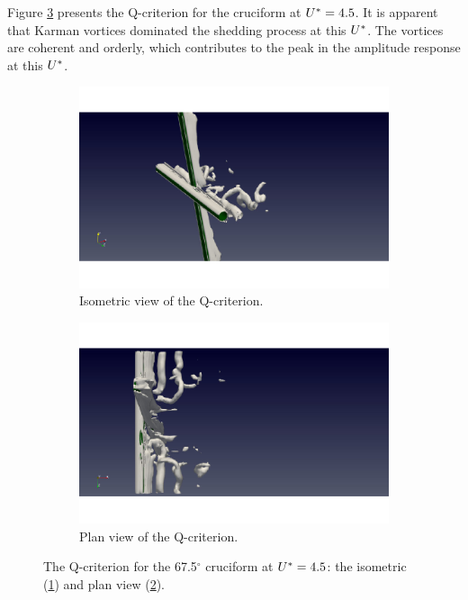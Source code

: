\documentclass[oneside]{utmthesis}
\begin{document}
Figure \ref{fig:qCrit675U02} presents the Q-criterion for the \angfo{} cruciform at $U^{*}=4.5$. It is apparent that Karman vortices dominated the shedding process at this $U^{*}$. The vortices are coherent and orderly, which contributes to the peak in the amplitude response at this $U^{*}$.

\begin{figure}[H]
  \centering
  \begin{subfigure}[h]{0.48\textwidth}
    \includegraphics[width=\textwidth,trim={1.5cm 0 3cm 0},clip]{figs/qIso675U02}
    \caption{Isometric view of the Q-criterion.}
    \label{fig:qIso675U02}
  \end{subfigure}
  \hfill
  \begin{subfigure}[h]{0.48\textwidth}
    \includegraphics[width=\textwidth,trim={1.5cm 0 3cm 0},clip]{figs/qTop675U02}
    \caption{Plan view of the Q-criterion.}
    \label{fig:qTop675U02}
  \end{subfigure}

  \caption{The Q-criterion for the 67.5$^{\circ}$ cruciform at $U^{*} = 4.5$: the isometric (\ref{fig:qIso675U02}) and plan view (\ref{fig:qTop675U02}).} \label{fig:qCrit675U02}
\end{figure}
\end{document}
